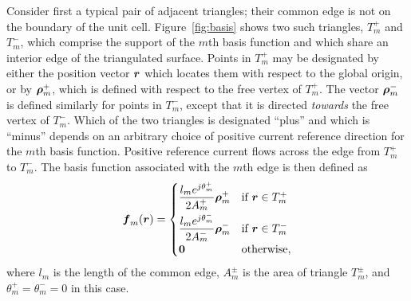 Consider first a typical pair of adjacent triangles; their common edge
is not on the boundary of the unit cell.
Figure~\ref{fig:basis} shows two such triangles, $T_m^+$ and $T_m^-$,
which comprise the support of the $m$th basis function and which
share an interior edge of the triangulated surface.  Points in $T_m^+$ may be designated 
by either the position vector $\boldsymbol{r}$ which locates them with respect to the global
origin, or by $\boldsymbol{\rho}_m^+$, which is defined with respect to the free vertex
of $T_m^+$.  The vector $\boldsymbol{\rho}_m^-$ is defined similarly for points in $T_m^-$, 
except that it is directed {\em towards} the free vertex of $T_m^-$.
Which of the two triangles is designated ``plus'' and which is ``minus'' depends
on an arbitrary choice of positive current reference direction for the
$m$th basis function.
Positive reference current flows across the edge from $T_m^+$ to $T_m^-$. The basis
function associated with the $m$th edge is then defined as
\begin{equation}
  \label{eq:basis}
  \f_m(\r) = 
  \begin{cases}
    \displaystyle
    \frac{l_m e^{j\theta_m^+}}{2A_m^+} \vecrho_m^+ & \text{if $\r \in T_m^+$} \\
    \displaystyle
    \frac{\rule{0pt}{3ex}l_m e^{j\theta_m^-}}{2A_m^-} \vecrho_m^- & \text{if $\r \in T_m^-$} \\
    \0 & \text{otherwise},
  \end{cases}
\end{equation}
where $l_m$ is the length of the common edge, $A_m^{\pm}$ is the area
of triangle $T_m^{\pm}$, and $\theta_m^+ = \theta_m^- = 0$ in this case.
%
